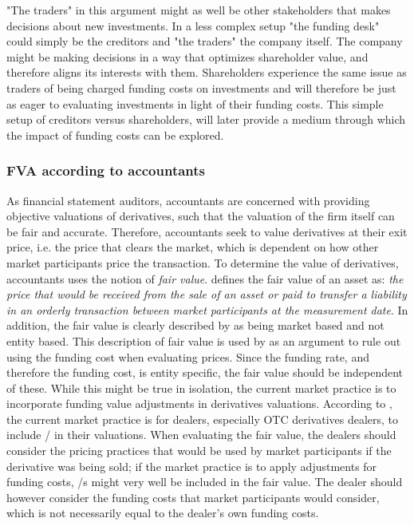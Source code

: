 \documentclass[./sub-main.tex]{subfiles}
\begin{document}
            "The traders" in this argument might as well be other stakeholders that makes decisions about new investments.
            In a less complex setup "the funding desk" could simply be the creditors and "the traders" the company itself.
            The company might be making decisions in a way that optimizes shareholder value,
            and therefore aligns its interests with them.
            Shareholders experience the same issue as traders of being charged funding costs on investments 
            and will therefore be just as eager to evaluating investments in light of their funding costs.
            This simple setup of creditors versus shareholders, 
            will later provide a medium through which the impact of funding costs can be explored.

        \subsubsection{FVA according to accountants}
            As financial statement auditors, accountants are concerned with providing objective valuations of derivatives,
            such that the valuation of the firm itself can be fair and accurate.
            Therefore, accountants seek to value derivatives at their exit price, i.e. the price that clears the market,
            which is dependent on how other market participants price the transaction.
            To determine the value of derivatives, accountants uses the notion of \textit{fair value}.
            \cite{IFRS13} defines the fair value of an asset as: 
            \textit{the price that would be received from the sale of an asset or paid to transfer a liability
            in an orderly transaction between market participants at the measurement date}.
            In addition, the fair value is clearly described by \cite{IFRS13} as being market based and not entity based.
            This description of fair value is used by \cite{HullWhiteFVA} as an argument to
            rule out using the funding cost when evaluating prices.
            Since the funding rate, and therefore the funding cost, is entity specific,
            the fair value should be independent of these.
            While this might be true in isolation, 
            the current market practice is to incorporate funding value adjustments in derivatives valuations.
            According to \cite{KPMGFVA}, the current market practice is for dealers, especially OTC derivatives dealers,
            to include \FVA/ in their valuations.  
            When evaluating the fair value, the dealers should consider the pricing practices 
            that would be used by market participants if the derivative was being sold;
            if the market practice is to apply adjustments for funding costs,
            \FVA/s might very well be included in the fair value.
            The dealer should however consider the funding costs that market participants would consider,
            which is not necessarily equal to the dealer's own funding costs.
\end{document}
